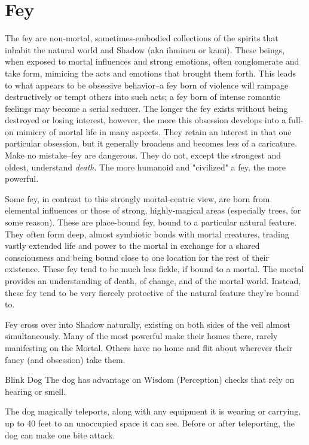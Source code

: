\clearpage
\section{Fey}
The fey are non-mortal, sometimes-embodied collections of the spirits that inhabit the natural world and Shadow (aka ihminen or kami). These beings, when exposed to mortal influences and strong emotions, often conglomerate and take form, mimicing the acts and emotions that brought them forth. This leads to what appears to be obsessive behavior--a fey born of violence will rampage destructively or tempt others into such acts; a fey born of intense romantic feelings may become a serial seducer. The longer the fey exists without being destroyed or losing interest, however, the more this obsession develops into a full-on mimicry of mortal life in many aspects. They retain an interest in that one particular obsession, but it generally broadens and becomes less of a caricature. Make no mistake--fey are dangerous. They do not, except the strongest and oldest, understand \textit{death}. The more humanoid and "civilized" a fey, the more powerful.

Some fey, in contrast to this strongly mortal-centric view, are born from elemental influences or those of strong, highly-magical areas (especially trees, for some reason). These are place-bound fey, bound to a particular natural feature. They often form deep, almost symbiotic bonds with mortal creatures, trading vastly extended life and power to the mortal in exchange for a shared consciousness and being bound close to one location for the rest of their existence. These fey tend to be much less fickle, if bound to a mortal. The mortal provides an understanding of death, of change, and of the mortal world. Instead, these fey tend to be very fiercely protective of the natural feature they're bound to.

Fey cross over into Shadow naturally, existing on both sides of the veil almost simultaneously. Many of the most powerful make their homes there, rarely manifesting on the Mortal. Others have no home and flit about wherever their fancy (and obsession) take them. 

\begin{DndMonster}{Blink Dog}
\DndMonsterBasics[armor-class={13}, hit-points={22 (4d8 + 4)}, speed={40 ft.}]
\DndMonsterDetails[saving-throws={}, skills={Perception +3, Stealth +5}, damage-immunities={}, damage-resistances={}, damage-vulnerabilities={}, condition-immunities={}, senses={passive Perception 13}, languages={Blink Dog, understands Sylvan but can't speak it}, challenge={1/4:1/2}]
 The dog has advantage on Wisdom (Perception) checks that rely on hearing or smell.

\DndMonsterAttack[
	name=Bite,
	distance=melee,
	type=weapon,
	mod=+3,
	reach=5,
	dmg=\DndDice{1d6 + 1},
	dmg-type=piercing
]
The dog magically teleports, along with any equipment it is wearing or carrying, up to 40 feet to an unoccupied space it can see. Before or after teleporting, the dog can make one bite attack.
\end{DndMonster}



